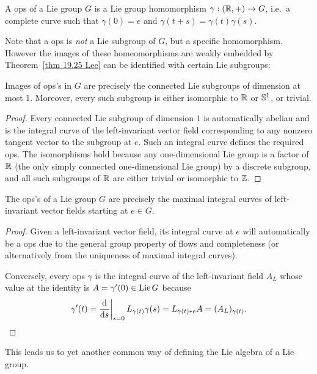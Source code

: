 \begin{defn}
    A \gls{ops} of a Lie group $G$ is a Lie group homomorphism $\gamma:(\mathbb{R},+)\to G$, i.e.~a complete curve such that $\gamma(0)=e$ and $\gamma(t+s)=\gamma(t)\gamma(s)$.
\end{defn}

Note that a \gls{ops} is \emph{not} a Lie subgroup of $G$, but a specific homomorphism. However the images of these homeomorphisms are weakly embedded by Theorem~\ref{thm 19.25 Lee} can be identified with certain Lie subgroups:

\begin{prop}
    Images of \gls{ops}'s in $G$ are precisely the connected Lie subgroups of dimension at most 1. Moreover, every such subgroup is either isomorphic to $\mathbb{R}$ or $\mathbb{S}^1$, or trivial.
\end{prop}
\begin{proof}
    Every connected Lie subgroup of dimension $1$ is automatically abelian and is the integral curve of the left-invariant vector field corresponding to any nonzero tangent vector to the subgroup at $e$. Such an integral curve defines the required \gls{ops}. The isomorphisms hold because any one-dimensional Lie group is a factor of $\mathbb{R}$ (the only simply connected one-dimensional Lie group) by a discrete subgroup, and all such subgroups of $\mathbb{R}$ are either trivial or isomorphic to $\mathbb{Z}$.
\end{proof}


\begin{thm}
    The \gls{ops}'s of a Lie group $G$ are precisely the maximal integral curves of left-invariant vector fields starting at $e\in G$.
\end{thm}
\begin{proof}
    Given a left-invariant vector field, its integral curve at $e$ will automatically be a \gls{ops} due to the general group property of flows and completeness (or alternatively from the uniqueness of maximal integral curves).

    Conversely, every \gls{ops} $\gamma$ is the integral curve of the left-invariant field $A_L$ whose value at the identity is $A=\gamma'(0)\in\operatorname{Lie} G$ because 
    \[\gamma'(t)=\restr{\frac{\dd}{\dd s}}{s=0}L_{\gamma(t)}\gamma(s)=L_{\gamma(t)\ast e}A=(A_L)_{\gamma(t)}.\]
\end{proof}

This leads us to yet another common way of defining the Lie algebra of a Lie group.

